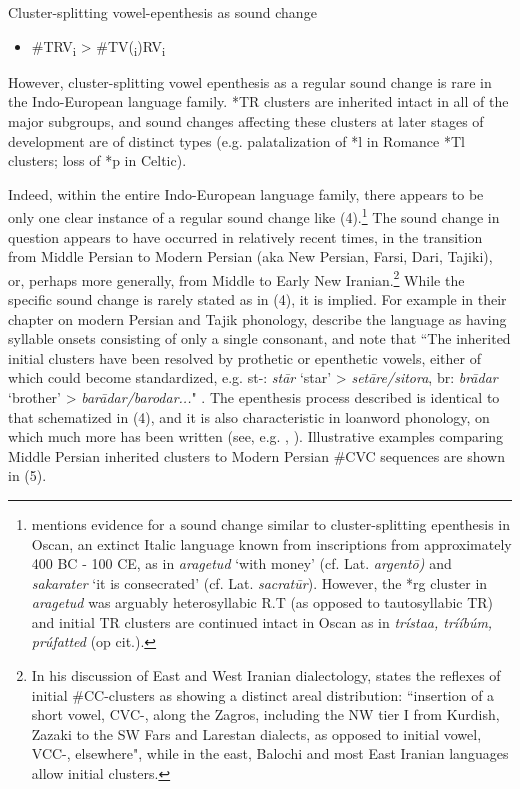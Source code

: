 \documentclass[output=paper,
modfonts
]{LSP/langsci}
\begin{document}
\begin{exe}
\ex Cluster-splitting vowel-epenthesis as sound change
\begin{itemize}
\item[] \#TRV\textsubscript{i} \textgreater{} \#TV(\textsubscript{i})RV\textsubscript{i}
\end{itemize}
\end{exe}

However, cluster-splitting vowel epenthesis as a regular sound change is
rare in the Indo-European language family. *TR clusters are inherited
intact in all of the major subgroups, and sound changes affecting these
clusters at later stages of development are of distinct types (e.g.
palatalization of *l in Romance *Tl clusters; loss of *p in Celtic).

Indeed, within the entire Indo-European language family, there appears
to be only one clear instance of a regular sound change like
(4).\footnote{\citet[302--303]{fortson2011} mentions evidence for a sound change
  similar to cluster-splitting epenthesis in Oscan, an extinct Italic
  language known from inscriptions from approximately 400 BC - 100 CE,
  as in \emph{aragetud} `with money' (cf. Lat. \emph{argentō)} and
  \emph{sakarater} `it is consecrated' (cf. Lat. \emph{sacratūr}).
  However, the *rg cluster in \emph{aragetud} was arguably
  heterosyllabic R.T (as opposed to tautosyllabic TR) and initial TR
  clusters are continued intact in Oscan as in \emph{trístaa, trííbúm,
  prúfatted} (op cit.).} The sound change in question appears to have
occurred in relatively recent times, in the transition from Middle
Persian to Modern Persian (aka New Persian, Farsi, Dari, Tajiki), or,
perhaps more generally, from Middle to Early New Iranian.\footnote{In
  his discussion of East and West Iranian dialectology, \citet[21]{windfuhr2009} states the reflexes of initial \#CC-clusters as showing a
  distinct areal distribution: ``insertion of a short vowel, CVC-, along
  the Zagros, including the NW tier I from Kurdish, Zazaki to the SW
  Fars and Larestan dialects, as opposed to initial vowel, VCC-,
  elsewhere", while in the east, Balochi and most East Iranian languages
  allow initial clusters.} While the specific sound change is rarely
stated as in (4), it is implied. For example in their chapter on modern
Persian and Tajik phonology, \citet[427--428]{windfuhrperry2009} describe
the language as having syllable onsets consisting of only a single
consonant, and note that ``The inherited initial clusters have been
resolved by prothetic or epenthetic vowels, either of which could become
standardized, e.g. st-: \emph{stār} `star' \textgreater{}
\emph{setāre/sitora}, br: \emph{brādar} `brother' \textgreater{}
\emph{barādar/barodar...}"  \citep[428]{windfuhrperry2009}. The epenthesis process
described is identical to that schematized in (4), and it is also
characteristic in loanword phonology, on which much more has been
written (see, e.g. \citealt{strain1968a}, \citealt{karimi1987a}). Illustrative examples
comparing Middle Persian inherited clusters to Modern Persian \#CVC
sequences are shown in (5).
\end{document}
